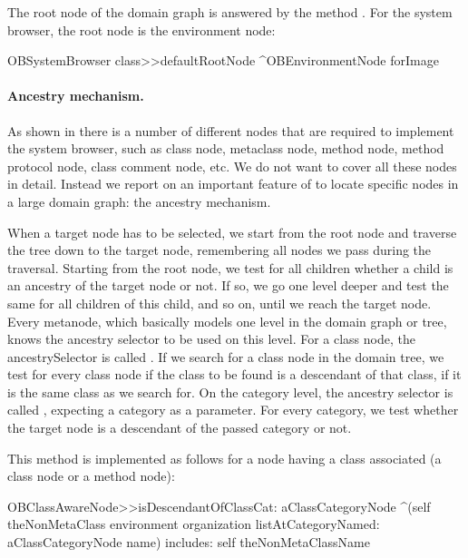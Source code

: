 \documentclass[a4paper,10pt,twoside]{book}
\begin{document}
The root node of the domain graph is answered by the method . For the system browser, the root node is the environment node:

\begin{code}{}
OBSystemBrowser class>>defaultRootNode
	^OBEnvironmentNode forImage
\end{code}


\paragraph{Ancestry mechanism.} As shown in  there is a number of different nodes that are required to implement the system browser, such as class node, metaclass node, method node, method protocol node, class comment node, etc. We do not want to cover all these nodes in detail. Instead we report on an important feature of \obf to locate specific nodes in a large domain graph: the ancestry mechanism. 

When a target node has to be selected, we start from the root node and traverse the tree down to the target node, remembering all nodes we pass during the traversal. Starting from the root node, we test for all children whether a child is an ancestry of the target node or not. If so, we go one level deeper and test the same for all children of this child, and so on, until we reach the target node. Every metanode, which basically models one level in the domain graph or tree, knows the ancestry selector to be used on this level. For a class node, the ancestrySelector is called . If we search for a class node in the domain tree, we test for every class node if the class to be found is a descendant of that class, \ie if it is the same class as we search for. On the category level, the ancestry selector is called , expecting a category as a parameter. For every category, we test whether the target node is a descendant of the passed category or not. 

This method  is implemented as follows for a node having a class associated (\eg a class node or a method node):

\begin{code}{}
OBClassAwareNode>>isDescendantOfClassCat: aClassCategoryNode
    ^(self theNonMetaClass environment organization 
		listAtCategoryNamed: aClassCategoryNode name)
			includes: self theNonMetaClassName
\end{code}
\end{document}
